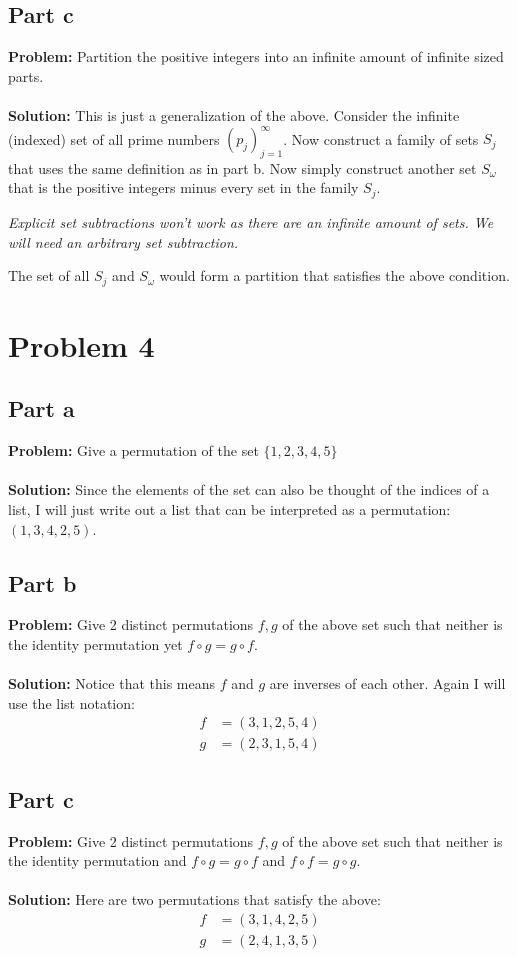 \documentclass{article}
\begin{document}
\subsection{Part c}
\textbf{Problem:} Partition the positive integers into an infinite amount of infinite sized parts.
\\\\
\textbf{Solution:} This is just a generalization of the above. Consider the infinite (indexed) set of all prime numbers $(p_j)_{j=1}^{\infty}$. Now construct a family of sets $S_j$ that uses the same definition as in part b. Now simply construct another set $S_{\omega}$ that is the positive integers minus every set in the family $S_j$.

\textit{Explicit set subtractions won't work as there are an infinite amount of sets. We will need an arbitrary set subtraction.}

The set of all $S_j$ and $S_\omega$ would form a partition that satisfies the above condition.

\section{Problem 4}
\subsection{Part a}
\textbf{Problem:} Give a permutation of the set $\{1,2,3,4,5\}$
\\\\
\textbf{Solution:} Since the elements of the set can also be thought of the indices of a list, I will just write out a list that can be interpreted as a permutation: $(1,3,4,2,5)$.

\subsection{Part b}
\textbf{Problem:} Give 2 distinct permutations $f,g$ of the above set such that neither is the identity permutation yet $f\circ g=g\circ f$.
\\\\
\textbf{Solution:} Notice that this means $f$ and $g$ are inverses of each other. Again I will use the list notation:
\begin{align*}
f&=(3,1,2,5,4)\\
g&=(2,3,1,5,4)
\end{align*}

\subsection{Part c}
\textbf{Problem:} Give 2 distinct permutations $f,g$ of the above set such that neither is the identity permutation and $f\circ g=g\circ f$ and $f\circ f=g\circ g$.
\\\\
\textbf{Solution:} Here are two permutations that satisfy the above:
\begin{align*}
f&=(3,1,4,2,5)\\
g&=(2,4,1,3,5)
\end{align*}
\end{document}

